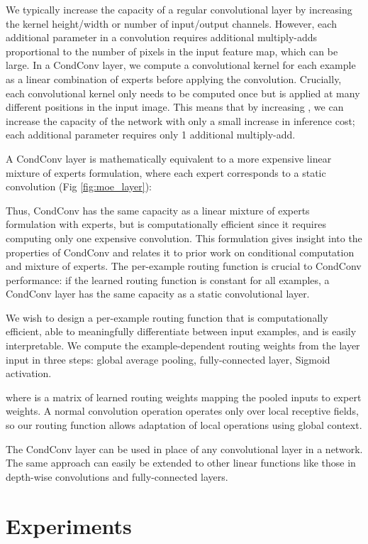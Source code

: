 \documentclass{article}
\def\codename{CondConv}
\begin{document}
We typically increase the capacity of a regular convolutional layer by increasing the kernel height/width or number of input/output channels. However, each additional parameter in a convolution requires additional multiply-adds proportional to the number of pixels in the input feature map, which can be large. In a \codename{} layer, we compute a convolutional kernel for each example as a linear combination of  experts before applying the convolution. Crucially, each convolutional kernel only needs to be computed once but is applied at many different positions in the input image. This means that by increasing , we can increase the capacity of the network with only a small increase in inference cost; each additional parameter requires only 1 additional multiply-add.

A \codename{} layer is mathematically equivalent to a more expensive linear mixture of experts formulation, where each expert corresponds to a static convolution (Fig \ref{fig:moe_layer}):

Thus, \codename{} has the same capacity as a linear mixture of experts formulation with  experts, but is computationally efficient since it requires computing only one expensive convolution. This formulation gives insight into the properties of \codename{} and relates it to prior work on conditional computation and mixture of experts. The per-example routing function is crucial to \codename{} performance: if the learned routing function is constant for all examples, a \codename{} layer has the same capacity as a static convolutional layer.

We wish to design a per-example routing function that is computationally efficient, able to meaningfully differentiate between input examples, and is easily interpretable. We compute the example-dependent routing weights  from the layer input in three steps: global average pooling, fully-connected layer, Sigmoid activation. 

where  is a matrix of learned routing weights mapping the pooled inputs to  expert weights. A normal convolution operation operates only over local receptive fields, so our routing function allows adaptation of local operations using global context.

The \codename{} layer can be used in place of any convolutional layer in a network. The same approach can easily be extended to other linear functions like those in depth-wise convolutions and fully-connected layers.

\section{Experiments} \label{experiments}
\end{document}
